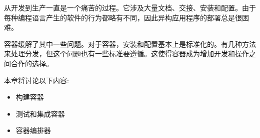 
从开发到生产一直是一个痛苦的过程。它涉及大量文档、交接、安装和配置。由于每种编程语言产生的软件的行为都略有不同，因此异构应用程序的部署总是很困难。

容器缓解了其中一些问题。对于容器，安装和配置基本上是标准化的。有几种方法来处理分发，但这个问题也有一些标准要遵循。这使得容器成为增加开发和操作之间合作的选择。

本章将讨论以下内容:

\begin{itemize}
\item 
构建容器

\item 
测试和集成容器

\item 
容器编排器
\end{itemize}